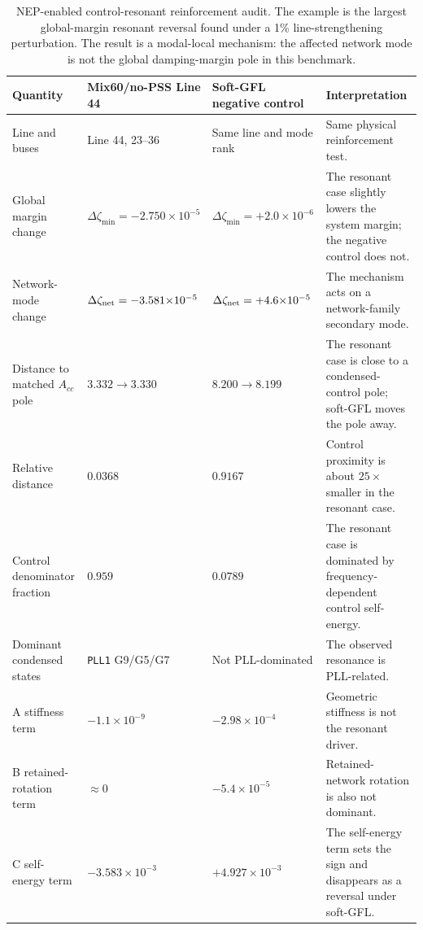 \documentclass[journal]{IEEEtran}
\begin{document}
\begin{table}[t]
\centering
\caption{NEP-enabled control-resonant reinforcement audit. The example is the largest global-margin resonant reversal found under a 1\% line-strengthening perturbation. The result is a modal-local mechanism: the affected network mode is not the global damping-margin pole in this benchmark.}
\label{tab:resonantbraess}
\scriptsize
\begin{tabular}{@{}p{}p{}p{}p{}@{}}
\toprule
Quantity & Mix60/no-PSS Line 44 & Soft-GFL negative control & Interpretation\\
\midrule
Line and buses & Line 44, 23--36 & Same line and mode rank & Same physical reinforcement test.\\
Global margin change & $\Delta\zeta_{\min}=-2.750{\times}10^{-5}$ & $\Delta\zeta_{\min}=+2.0{\times}10^{-6}$ & The resonant case slightly lowers the system margin; the negative control does not.\\
Network-mode change & $\Delta\zeta_{\rm net}=-3.581{\times}10^{-5}$ & $\Delta\zeta_{\rm net}=+4.6{\times}10^{-5}$ & The mechanism acts on a network-family secondary mode.\\
Distance to matched $A_{cc}$ pole & $3.332\rightarrow3.330$ & $8.200\rightarrow8.199$ & The resonant case is close to a condensed-control pole; soft-GFL moves the pole away.\\
Relative distance & $0.0368$ & $0.9167$ & Control proximity is about $25\times$ smaller in the resonant case.\\
Control denominator fraction & $0.959$ & $0.0789$ & The resonant case is dominated by frequency-dependent control self-energy.\\
Dominant condensed states & \texttt{PLL1} G9/G5/G7 & Not PLL-dominated & The observed resonance is PLL-related.\\
A stiffness term & $-1.1{\times}10^{-9}$ & $-2.98{\times}10^{-4}$ & Geometric stiffness is not the resonant driver.\\
B retained-rotation term & $\approx0$ & $-5.4{\times}10^{-5}$ & Retained-network rotation is also not dominant.\\
C self-energy term & $-3.583{\times}10^{-3}$ & $+4.927{\times}10^{-3}$ & The self-energy term sets the sign and disappears as a reversal under soft-GFL.\\
\bottomrule
\end{tabular}
\end{table}
\end{document}
